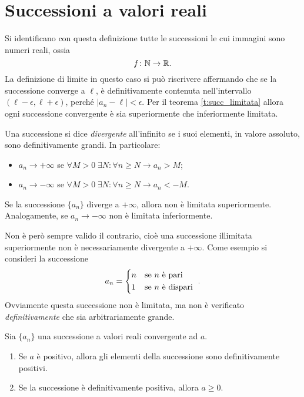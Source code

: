 \section{Successioni a valori reali}
Si identificano con questa definizione tutte le successioni le cui immagini sono numeri reali, ossia
\[
f\colon\mathbb{N}\to\mathbb{R}.
\]
La definizione di limite in questo caso si può riscrivere affermando che se la successione converge a $\ell$, è definitivamente contenuta nell'intervallo $(\ell-\epsilon,\ell+\epsilon)$, perché $|a_n-\ell|<\epsilon$.
Per il teorema \ref{t:succ_limitata} allora ogni successione convergente è sia superiormente che inferiormente limitata.

\begin{definizione}
Una successione si dice \emph{divergente} all'infinito se i suoi elementi, in valore assoluto, sono definitivamente grandi. In particolare:
\begin{itemize}
\item $a_n\to +\infty$ se $\forall M>0\;\exists N\colon\forall n\geq N\to a_n>M$;
\item $a_n\to -\infty$ se $\forall M>0\;\exists N\colon\forall n\geq N\to a_n<-M$.
\end{itemize}
\end{definizione}
\begin{teorema}
Se la successione $\{a_n\}$ diverge a $+\infty$, allora non è limitata superiormente. Analogamente, se $a_n\to -\infty$ non è limitata inferiormente.
\end{teorema}
Non è però sempre valido il contrario, cioè una successione illimitata superiormente non è necessariamente divergente a $+\infty$. Come esempio si consideri la successione
\[
a_n=
\begin{cases*}
	n & se $n$ è pari\\
	1 & se $n$ è dispari
\end{cases*}.
\]
Ovviamente questa successione non è limitata, ma non è verificato \emph{definitivamente} che sia arbitrariamente grande.
\begin{teorema}
\label{t:permanenza_segno}
Sia $\{a_n\}$ una successione a valori reali convergente ad $a$.
\begin{enumerate}
\item Se $a$ è positivo, allora gli elementi della successione sono definitivamente positivi.
\item Se la successione è definitivamente positiva, allora $a\geq 0$.
\end{enumerate}
\end{teorema}
